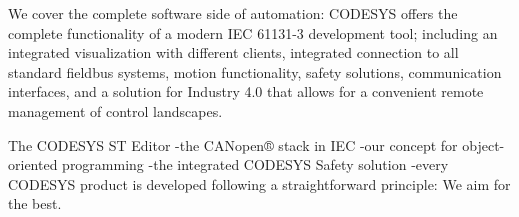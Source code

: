  We cover the complete software side of automation: CODESYS offers the complete functionality of a modern IEC 61131-3 development tool; including an integrated visualization with different clients, integrated connection to all standard fieldbus systems, motion functionality, safety solutions, communication interfaces, and a solution for Industry 4.0 that allows for a convenient remote management of control landscapes.
  
  The CODESYS ST Editor -the CANopen® stack in IEC -our concept for object-oriented programming -the integrated CODESYS Safety solution  -every CODESYS product is developed following a straightforward principle: We aim for the best.